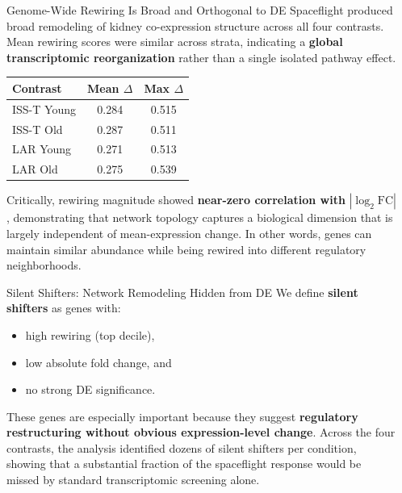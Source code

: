\documentclass[final]{beamer}
\newlength{\sepwidth}
\newlength{\colwidth}
\newcommand{\separatorcolumn}{\begin{column}{\sepwidth}\end{column}}
\begin{document}
\begin{frame}[t]
\begin{columns}[t]
\separatorcolumn

\begin{column}{\colwidth}

\begin{block}{Genome-Wide Rewiring Is Broad and Orthogonal to DE}
Spaceflight produced broad remodeling of kidney co-expression structure across all four contrasts. Mean rewiring scores were similar across strata, indicating a \textbf{global transcriptomic reorganization} rather than a single isolated pathway effect.

\begin{center}
\renewcommand{\arraystretch}{1.2}
\begin{tabular}{lcc}
\toprule
\textbf{Contrast} & \textbf{Mean $\Delta$} & \textbf{Max $\Delta$} \\
\midrule
ISS-T Young & 0.284 & 0.515 \\
ISS-T Old   & 0.287 & 0.511 \\
LAR Young   & 0.271 & 0.513 \\
LAR Old     & 0.275 & 0.539 \\
\bottomrule
\end{tabular}
\end{center}

\medskip
Critically, rewiring magnitude showed \textbf{near-zero correlation with} $|\log_2 \mathrm{FC}|$, demonstrating that network topology captures a biological dimension that is largely independent of mean-expression change. In other words, genes can maintain similar abundance while being rewired into different regulatory neighborhoods.
\end{block}

\begin{alertblock}{Silent Shifters: Network Remodeling Hidden from DE}
We define \textbf{silent shifters} as genes with:
\begin{itemize}
  \item high rewiring (top decile),
  \item low absolute fold change, and
  \item no strong DE significance.
\end{itemize}

These genes are especially important because they suggest \textbf{regulatory restructuring without obvious expression-level change}. Across the four contrasts, the analysis identified dozens of silent shifters per condition, showing that a substantial fraction of the spaceflight response would be missed by standard transcriptomic screening alone.
\end{alertblock}


\end{column}
\end{columns}
\end{frame}
\end{document}
